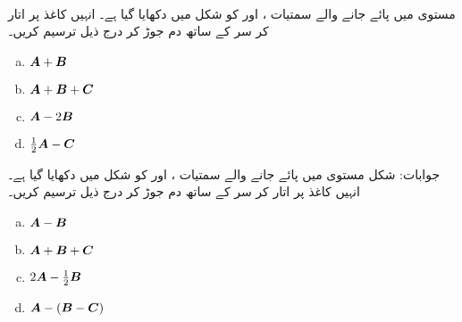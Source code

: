 \\
مستوی میں پائے جانے والے سمتیات ،  اور  کو شکل  میں دکھایا گیا ہے۔ انہیں کاغذ پر اتار کر سر کے ساتھ دم جوڑ کر درج ذیل ترسیم کریں۔
\begin{multicols}{4}
\begin{enumerate}[a.]
\item
${{\boldsymbol{A}}}+{{\boldsymbol{B}}}$
\item
${{\boldsymbol{A}}}+{{\boldsymbol{B}}}+{{\boldsymbol{C}}}$
\item
${{\boldsymbol{A}}}-2{{\boldsymbol{B}}}$
\item
$\frac{1}{2}{{\boldsymbol{A}}}-{{\boldsymbol{C}}}$
\end{enumerate}
\end{multicols}
جوابات:\quad
شکل 
مستوی میں پائے جانے والے سمتیات ،  اور  کو شکل  میں دکھایا گیا ہے۔ انہیں کاغذ پر اتار کر سر کے ساتھ دم جوڑ کر درج ذیل ترسیم کریں۔
\begin{multicols}{4}
\begin{enumerate}[a.]
\item
${{\boldsymbol{A}}}-{{\boldsymbol{B}}}$
\item
${{\boldsymbol{A}}}+{{\boldsymbol{B}}}+{{\boldsymbol{C}}}$
\item
$2{{\boldsymbol{A}}}-\frac{1}{2}{{\boldsymbol{B}}}$
\item
${{\boldsymbol{A}}}-({{\boldsymbol{B}}}-{{\boldsymbol{C}}})$
\end{enumerate}
\end{multicols}
